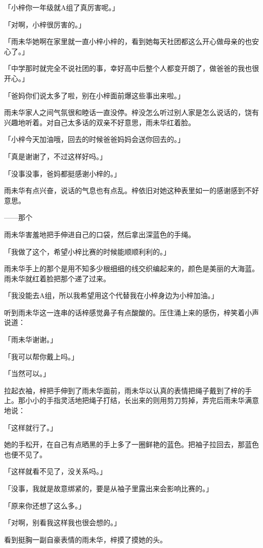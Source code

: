 \documentclass[UTF8]{ctexart}
\begin{document}
    「小梓你一年级就A组了真厉害呢。」

    「对啊，小梓很厉害的。」

    「雨未华她啊在家里就一直小梓小梓的，看到她每天社团都这么开心做母亲的也安心了。」

    「中学那时就完全不说社团的事，幸好高中后整个人都变开朗了，做爸爸的我也很开心。」

    「爸妈你们说太多了啦，别在小梓面前爆这些事出来啦。」

    雨未华家人之间气氛很和睦话一直没停。梓没怎么听过别人家是怎么说话的，饶有兴趣地听着。对自己太多话的双亲不好意思，雨未华红着脸。

    「小梓今天加油哦，回去的时候爸爸妈妈会送你回去的。」

    「真是谢谢了，不过这样好吗。」

    「没事没事，爸妈都挺感谢小梓的。」

    雨未华有点兴奋，说话的气息也有点乱。梓依旧对她这种表里如一的感谢感到不好意思。

    ——那个

    雨未华害羞地把手伸进自己的口袋，然后拿出深蓝色的手绳。

    「我做了这个，希望小梓比赛的时候能顺顺利利的。」

    雨未华手上的那个是用不知多少根细细的线交织编起来的，颜色是美丽的大海蓝。雨未华就红着脸把那个递了过来。

    「我没能去A组，所以我希望用这个代替我在小梓身边为小梓加油。」

    听到雨未华这一连串的话梓感觉鼻子有点酸酸的。压住涌上来的感伤，梓笑着小声说道：

    「雨未华谢谢。」

    「我可以帮你戴上吗。」

    「当然可以。」

    拉起衣袖，梓把手伸到了雨未华面前，雨未华以认真的表情把绳子戴到了梓的手上。那小小的手指灵活地把绳子打结，长出来的则用剪刀剪掉，弄完后雨未华满意地说：

    「这样就行了。」

    她的手松开，在自己有点晒黑的手上多了一圈鲜艳的蓝色。把袖子拉回去，那蓝色也便不见了。

    「这样就看不见了，没关系吗。」

    「没事，我就是故意绑紧的，要是从袖子里露出来会影响比赛的。」

    「原来你还想了这么多。」

    「对啊，别看我这样我也很会想的。」

    看到挺胸一副自豪表情的雨未华，梓摸了摸她的头。
\end{document}
